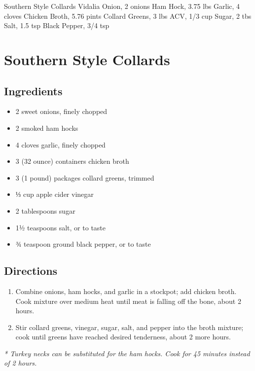 Southern Style Collards
  Vidalia Onion, 2 onions
  Ham Hock, 3.75 lbs
  Garlic, 4 cloves
  Chicken Broth, 5.76 pints
  Collard Greens, 3 lbs
  ACV, 1/3 cup
  Sugar, 2 tbs
  Salt, 1.5 tsp
  Black Pepper, 3/4 tsp

\section{ Southern Style Collards }

\subsection{ Ingredients }

\begin{itemize}
  \item 2 sweet onions, finely chopped
  \item 2 smoked ham hocks
  \item 4 cloves garlic, finely chopped
  \item 3 (32 ounce) containers chicken broth
  \item 3 (1 pound) packages collard greens, trimmed
  \item ⅓ cup apple cider vinegar
  \item 2 tablespoons sugar
  \item 1½ teaspoons salt, or to taste
  \item ¾ teaspoon ground black pepper, or to taste
\end{itemize}

\subsection{ Directions }

\begin{enumerate}
  \item Combine onions, ham hocks, and garlic in a stockpot; add chicken broth. Cook mixture over medium heat until meat is falling off the bone, about 2 hours.
  \item Stir collard greens, vinegar, sugar, salt, and pepper into the broth mixture; cook until greens have reached desired tenderness, about 2 more hours.
\end{enumerate}

\textit{* Turkey necks can be substituted for the ham hocks. Cook for 45 minutes instead of 2 hours. }
